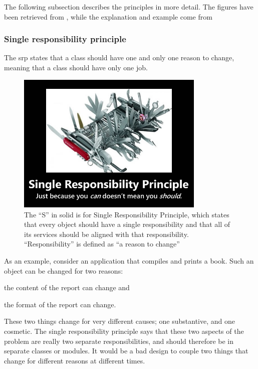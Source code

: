The following subsection describes the principles in more detail.
The figures have been retrieved from \cite{Devilla2009}, while the explanation and example come from \cite{OODesigncom2018,Janssen2018,Laanaya2016,Lipovetskii2017}

\subsubsection{Single responsibility principle }
\begin{framed}
The \gls{srp} states that a class should have one and only one reason to change, meaning that a class should have only one job.	
\end{framed}

\begin{figure}
	\centering
	\includegraphics[width=0.8\textwidth]{images/kotlin/SRP.jpg}
	\caption{The “S” in \gls{solid} is for Single Responsibility Principle, which states that every object should have a single responsibility and that all of its services should be aligned with that responsibility.
		“Responsibility” is defined as “a reason to change”}
	\label{fir:SRP}
\end{figure}

As an example, consider an application that compiles and prints a book.
Such an object can be changed for two reasons:
\begin{inparaenum}[(i)]
	\item the content of the report can change and
	\item the format of the report can change.
\end{inparaenum}
 These two things change for very different causes; one substantive, and one cosmetic.
The single responsibility principle says that these two aspects of the problem are really two separate responsibilities, and should therefore be in separate classes or modules.
It would be a bad design to couple two things that change for different reasons at different times.

